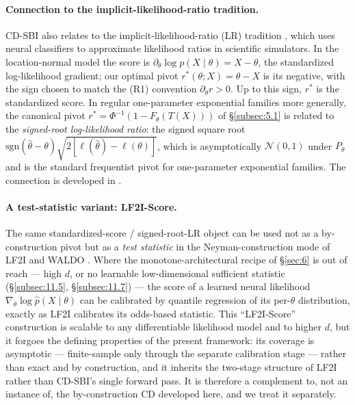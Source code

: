 \documentclass[11pt]{article}
\begin{document}
\paragraph{Connection to the implicit-likelihood-ratio tradition.}
CD-SBI also relates to the implicit-likelihood-ratio (LR) tradition
\citep{CranmerEtAl2015}, which uses neural classifiers to approximate
likelihood ratios in scientific simulators. In the location-normal
model the score is \(\partial_\theta \log p(X \mid \theta) = X - \theta\),
the standardized log-likelihood gradient; our optimal pivot
\(r^*(\theta; X) = \theta - X\) is its negative, with the sign chosen
to match the (R1) convention \(\partial_\theta r > 0\). Up to this
sign, \(r^*\) is the standardized score. In regular one-parameter
exponential families more generally, the canonical pivot
\(r^* = \Phi^{-1}(1 - F_\theta(T(X)))\) of \S\ref{subsec:5.1} is related
to the \emph{signed-root log-likelihood ratio}: the signed square root
\(\mathrm{sgn}(\hat\theta - \theta) \sqrt{2[\ell(\hat\theta) - \ell(\theta)]}\),
which is asymptotically \(\mathcal{N}(0, 1)\) under \(P_\theta\) and is
the standard frequentist pivot for one-parameter exponential families.
The connection is developed in \citet[ch.~5]{SchwederHjort2016}.

\paragraph{A test-statistic variant: LF2I-Score.}
The same standardized-score / signed-root-LR object can be used not as a
by-construction pivot but as a \emph{test statistic} in the
Neyman-construction mode of LF2I \citep{DalmassoEtAl2024} and WALDO
\citep{MasseranoEtAl2023}. Where the monotone-architectural recipe of
\S\ref{sec:6} is out of reach --- high \(d\), or no learnable
low-dimensional sufficient statistic (\S\ref{subsec:11.5},
\S\ref{subsec:11.7}) --- the score of a learned neural likelihood
\(\nabla_\theta \log \hat p(X \mid \theta)\) can be calibrated by quantile
regression of its per-\(\theta\) distribution, exactly as LF2I calibrates
its odds-based statistic. This ``LF2I-Score'' construction is scalable to
any differentiable likelihood model and to higher \(d\), but it forgoes
the defining properties of the present framework: its coverage is
asymptotic --- finite-sample only through the separate calibration stage
--- rather than exact and by construction, and it inherits the two-stage
structure of LF2I rather than CD-SBI's single forward pass. It is
therefore a complement to, not an instance of, the by-construction CD
developed here, and we treat it separately.
\end{document}
